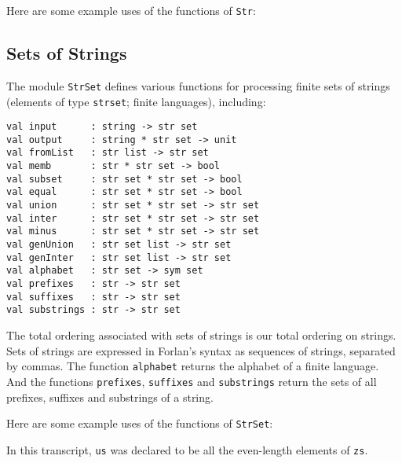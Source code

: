 Here are some example uses of the functions of \texttt{Str}:


\subsection{Sets of Strings}

The module \texttt{StrSet}
%
defines various functions for processing
finite sets of strings (elements of type \texttt{str\;set};
%
finite languages),
%
including:
\begin{verbatim}
val input      : string -> str set
val output     : string * str set -> unit
val fromList   : str list -> str set
val memb       : str * str set -> bool
val subset     : str set * str set -> bool
val equal      : str set * str set -> bool
val union      : str set * str set -> str set
val inter      : str set * str set -> str set
val minus      : str set * str set -> str set
val genUnion   : str set list -> str set
val genInter   : str set list -> str set
val alphabet   : str set -> sym set
val prefixes   : str -> str set
val suffixes   : str -> str set
val substrings : str -> str set
\end{verbatim}
%
%
%
%
%
%
%
%
%
%
%
%
%
%
%
The total ordering associated with sets of strings is our
total ordering on strings.
Sets of strings are expressed in Forlan's syntax as sequences of strings,
separated by commas.
The function \texttt{alphabet} returns the alphabet of a finite
language. And the functions \texttt{prefixes}, \texttt{suffixes} and
\texttt{substrings} return the sets of all prefixes, suffixes and
substrings of a string.

Here are some example uses of the functions of \texttt{StrSet}:

In this transcript, \texttt{us} was declared to be all the even-length
elements of \texttt{zs}.

